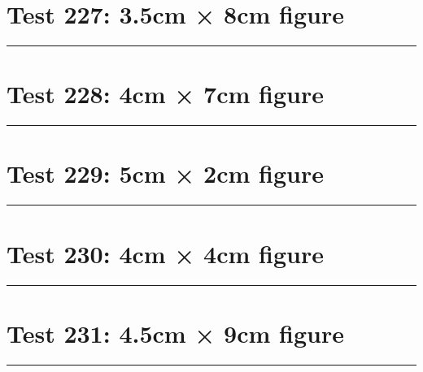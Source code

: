 \documentclass[a4paper,11pt]{article}
\begin{document}
\section*{Test 227: 3.5cm × 8cm figure}
\begin{swarmwrap}%
  \begin{minipage}[t]{3cm}
    \centering
    \rule{\linewidth}{8cm}
  \end{minipage}%
\end{swarmwrap}%
\swarmwrapnext
\lipsum[50]
\lipsum[51]
\lipsum[52]
\section*{Test 228: 4cm × 7cm figure}
\begin{swarmwrap}%
  \begin{minipage}[t]{4cm}
    \centering
    \rule{\linewidth}{7cm}
  \end{minipage}%
\end{swarmwrap}%
\swarmwrapnext
\lipsum[115]
\lipsum[116]
\lipsum[117]
\lipsum[118]
\lipsum[119]
\lipsum[120]
\section*{Test 229: 5cm × 2cm figure}
\begin{swarmwrap}%
  \begin{minipage}[t]{5cm}
    \centering
    \rule{\linewidth}{2cm}
  \end{minipage}%
\end{swarmwrap}%
\swarmwrapnext
\lipsum[70]
\lipsum[71]
\lipsum[72]
\lipsum[73]
\section*{Test 230: 4cm × 4cm figure}
\begin{swarmwrap}%
  \begin{minipage}[t]{4cm}
    \centering
    \rule{\linewidth}{4cm}
  \end{minipage}%
\end{swarmwrap}%
\swarmwrapnext
\lipsum[114]
\lipsum[115]
\lipsum[116]
\lipsum[117]
\lipsum[118]
\section*{Test 231: 4.5cm × 9cm figure}
\begin{swarmwrap}%
  \begin{minipage}[t]{4cm}
    \centering
    \rule{\linewidth}{9cm}
  \end{minipage}%
\end{swarmwrap}%
\swarmwrapnext
\lipsum[9]
\lipsum[10]
\lipsum[11]
\end{document}
